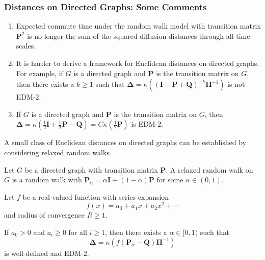 \documentclass[professionalfonts, hyperref={pdfpagelabels=false,
  colorlinks=true, linkcolor=purple}]{beamer}
\begin{document}
\begin{frame}
  \frametitle{Distances on Directed Graphs: Some Comments}
  \begin{enumerate}
  \item Expected commute time under the random walk model with
    transition matrix $\mathbf{P}^{2}$ is no longer the sum of the
    squared diffusion distances through all time scales.
  \item It is harder to derive a framework for Euclidean distances on
    directed graphs. For example, if $G$ is a directed graph and
    $\mathbf{P}$ is the transition matrix on $G$, then there exists a
    $k \geq 1$ such that $\bm{\Delta} = \kappa((\mathbf{I} -
    \mathbf{P} + \mathbf{Q})^{-k} \bm{\Pi}^{-1})$ is not
    EDM-2. 
  \item If $G$ is a directed graph and $\mathbf{P}$ is the transition
    matrix on $G$, then $\bm{\Delta} = \kappa(\tfrac{1}{2}\mathbf{I} +
    \tfrac{1}{2}\mathbf{P}- \mathbf{Q}) = C \kappa(\tfrac{1}{2}
    \mathbf{P})$ is EDM-2.
  \end{enumerate}
\end{frame}

\begin{frame}
  A small class of Euclidean distances on directed graphs can be
  established by considering \alert{relaxed} random walks.

  \vskip10pt Let $G$ be a directed graph with transition matrix
  $\mathbf{P}$. A relaxed random walk on $G$ is a random walk with
  $\mathbf{P}_\alpha = \alpha \mathbf{I} + (1- \alpha)\mathbf{P}$ for
  some $\alpha \in (0,1)$.

  \vskip10pt Let $f$ be a real-valued function with series expansion
  \begin{equation*}
    f(x) = a_0 + a_1 x + a_2 x^2 + \cdots
  \end{equation*}
  and radius of convergence $R \geq 1$. 
  
  \vskip10pt
  \begin{alertblock}{}
    If $a_0 > 0$ and $a_i \geq
    0$ for all $i \geq 1$, then there exists a $\alpha \in [0,1)$ such
    that 
    \begin{equation*}
      \bm{\Delta} = \kappa(f(\mathbf{P}_\alpha - \mathbf{Q})
      \bm{\Pi}^{-1})        
    \end{equation*}
    is well-defined and EDM-2.
  \end{alertblock}{}
\end{frame}
\end{document}
